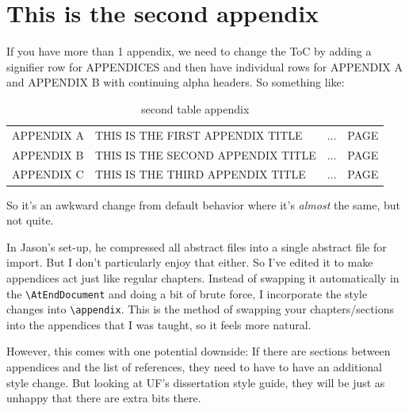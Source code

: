 \documentclass[../main.tex]{subfiles}
\begin{document}
\chapter{This is the second appendix}
If you have more than 1 appendix, we need to change the ToC by adding a signifier row for APPENDICES and then have individual rows for APPENDIX A and APPENDIX B with continuing alpha headers. So something like:
\begin{table}[]
    \centering
    \begin{tabular}{l l c r}
        APPENDIX A & THIS IS THE FIRST APPENDIX TITLE& ... & PAGE\\
        APPENDIX B & THIS IS THE SECOND APPENDIX TITLE& ... & PAGE\\
        APPENDIX C & THIS IS THE THIRD APPENDIX TITLE& ... & PAGE\\
    \end{tabular}
    \caption[Second appendix table]{second table appendix}
    \label{tab:AppToC2}
\end{table}

So it's an awkward change from default behavior where it's \*\textit{almost}\* the same, but not quite.

In Jason's set-up, he compressed all abstract files into a single abstract file for import. But I don't particularly enjoy that either. So I've edited it to make appendices act just like regular chapters. Instead of swapping it automatically in the \verb|\AtEndDocument| and doing a bit of brute force, I incorporate the style changes into \verb|\appendix|. This is the method of swapping your chapters/sections into the appendices that I was taught, so it feels more natural.

However, this comes with one potential downside: If there are sections between appendices and the list of references, they need to have to have an additional style change. But looking at UF's dissertation style guide, they will be just as unhappy that there are extra bits there.
\end{document}
